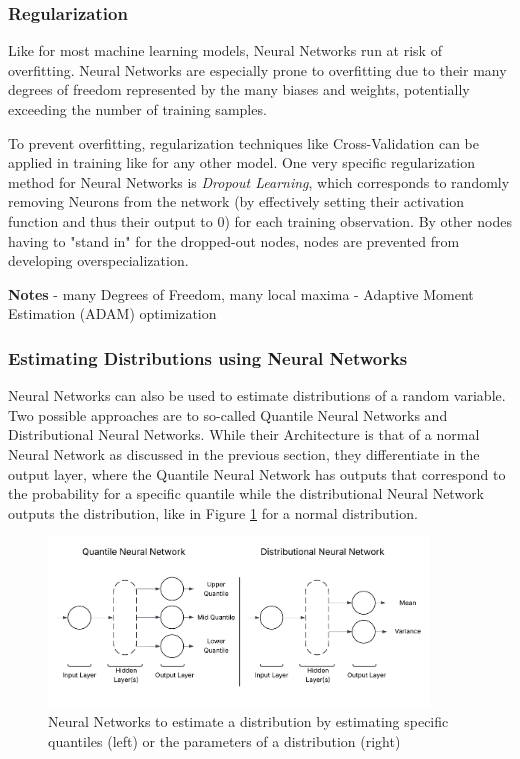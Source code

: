  \subsubsection{Regularization}
 
 Like for most machine learning models, Neural Networks run at risk of overfitting. Neural Networks are especially prone to overfitting due to their many degrees of freedom represented by the many biases and weights, potentially exceeding the number of training samples.

 To prevent overfitting, regularization techniques like Cross-Validation can be applied in training like for any other model. One very specific regularization method for Neural Networks is \textit{Dropout Learning}, which corresponds to randomly removing Neurons from the network (by effectively setting their activation function and thus their output to 0) for each training observation. By other nodes having to "stand in" for the dropped-out nodes, nodes are prevented from developing overspecialization. \cite{James2023}



\textbf{Notes}
- many Degrees of Freedom, many local maxima
- Adaptive Moment Estimation (ADAM) optimization

\subsubsection{Estimating Distributions using Neural Networks }

Neural Networks can also be used to estimate distributions of a random variable. Two possible approaches are to so-called Quantile Neural Networks and Distributional Neural Networks. While their Architecture is that of a normal Neural Network as discussed in the previous section, they differentiate in the output layer, where the Quantile Neural Network has outputs that correspond to the probability for a specific quantile while the distributional Neural Network outputs the distribution, like in Figure  \ref{fig:quantile_dist_nn} for a normal distribution.


\begin{figure}[h] 
	\centering
	\includegraphics[width=0.9\textwidth]{figures/modelling/quantile_dist_nn.png} 
	\caption{Neural Networks to estimate a distribution by estimating specific quantiles (left) or the parameters of a distribution (right)}
	\label{fig:quantile_dist_nn}
\end{figure}

